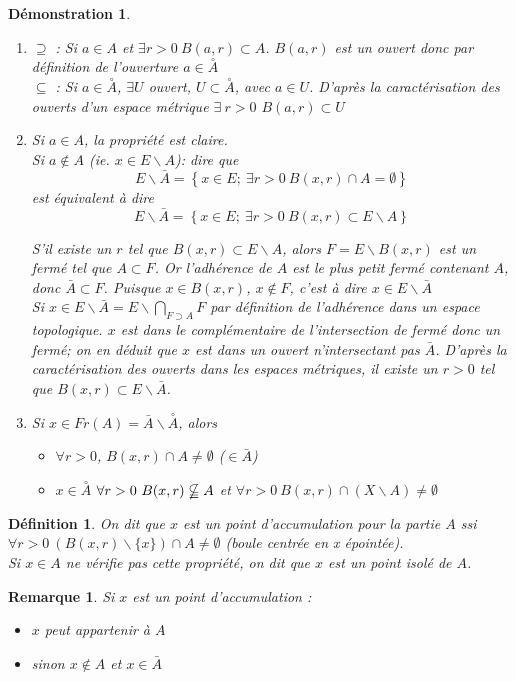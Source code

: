 \documentclass[a4paper, oneside]{report}
\theoremstyle{break}
\newtheorem{defi}[thm]{Définition}
\newtheorem*{demo}{Démonstration}
\newtheorem{remar}[thm]{Remarque}
\newcommand{\cerc}[1]{\overset{\circ}{#1}}
\begin{document}
\begin{demo}
\begin{enumerate}
\item $\supseteq$ : Si $a\in A$ et $\exists r>0~B(a,r)\subset A$. $B(a,r)$ est un ouvert donc par définition de l'ouverture $a\in \cerc{A}$\\
$\subseteq$ : Si $a\in \cerc{A}$, $\exists U$ ouvert, $U\subset \cerc{A}$, avec $a\in U$. D'après la caractérisation des ouverts d'un espace métrique $\exists~r>0$ $B(a,r)\subset U$

\item Si $a\in A$, la propriété est claire.\\
  Si $a\notin A$ (ie. $x \in E\backslash A$):
  dire que 
  $$E\backslash \bar{A} = \left\{x\in E;~\exists r>0~ B(x,r) \cap A = \emptyset \right\}$$
  est équivalent à dire
  $$E\backslash \bar{A} = \left\{x\in E;~\exists r>0~ B(x,r) \subset E\backslash A \right\}$$
  
  S'il existe un $r$ tel que $B(x,r)\subset E\backslash A$, alors $F=E\backslash B(x,r)$ est un fermé tel que $A\subset F$. Or l'adhérence de $A$ est le plus petit fermé contenant $A$, donc $\bar{A}\subset F$. Puisque $x\in B(x, r)$, $x\notin F$, c'est à dire $x\in E\backslash \bar{A}$\\
  Si $x\in E\backslash \bar{A}=E\backslash \bigcap_{F\supset A}F$ par définition de l'adhérence dans un espace topologique. $x$ est dans le complémentaire de l'intersection de fermé donc un fermé; on en déduit que $x$ est dans un ouvert n'intersectant pas $\bar{A}$. D'après la caractérisation des ouverts dans les espaces métriques, il existe un $r>0$ tel que  $B(x, r) \subset E\backslash \bar{A}$.\\
  
\item Si $x\in Fr(A)=\bar{A} \backslash \cerc{A}$, alors 
\begin{itemize}
\item  $\forall r>0$, $B(x,r)\cap A \neq \emptyset$ ($\in \bar{A}$)
\item $x\in \cerc{A}$ $\forall r>0~B(x,r)\nsubseteqq A$ et $\forall r>0~B(x,r)\cap (X\backslash A)\neq \emptyset$
\end{itemize}

\end{enumerate}
\end{demo}



\begin{defi}                    
On dit que $x$ est un point d'accumulation pour la partie $A$ ssi $\forall r>0~(B(x,r)\backslash \{x\}) \cap A \neq \emptyset$ (boule centrée en x épointée).\\
Si $x\in A$ ne vérifie pas cette propriété, on dit que $x$ est un point isolé de $A$.
\end{defi}
\begin{remar}
Si $x$ est un point d'accumulation :
\begin{itemize}
\item $x$ peut appartenir à $A$
\item sinon $x\notin A$ et $x\in \bar{A}$
\end{itemize}
\end{remar}
\end{document}
